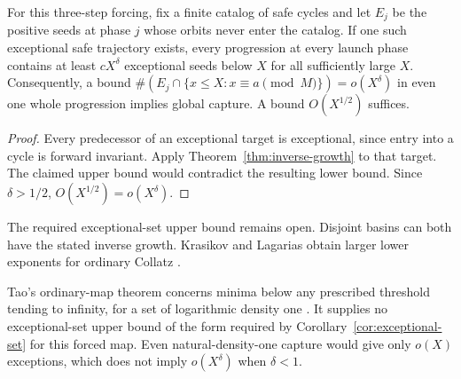 \begin{corollary}
\label{cor:exceptional-set}
For this three-step forcing, fix a finite catalog of safe cycles and let
$E_j$ be the positive seeds at phase $j$ whose orbits never enter the
catalog. If one such exceptional safe trajectory exists, every progression
at every launch phase contains at least $cX^\delta$ exceptional seeds
below $X$ for all sufficiently large $X$. Consequently, a bound
$\#(E_j\cap\{x\le X:x\equiv a\pmod M\})=o(X^\delta)$ in even one
whole progression implies global capture. A bound $O(X^{1/2})$ suffices.
\end{corollary}
\begin{proof}
Every predecessor of an exceptional target is exceptional, since entry
into a cycle is forward invariant. Apply Theorem~\ref{thm:inverse-growth}
to that target. The claimed upper bound would contradict the resulting
lower bound. Since $\delta>1/2$, $O(X^{1/2})=o(X^\delta)$.
\end{proof}

The required exceptional-set upper bound remains open. Disjoint basins
can both have the stated inverse growth. Krasikov and Lagarias obtain
larger lower exponents for ordinary Collatz \cite{krasikov-lagarias}.

Tao's ordinary-map theorem concerns minima below any prescribed threshold
tending to infinity, for a set of logarithmic density one
\cite[Theorem~1.3 and Remark~1.4]{tao}. It supplies no exceptional-set upper
bound of the form required by Corollary~\ref{cor:exceptional-set} for this
forced map. Even natural-density-one capture would give only $o(X)$
exceptions, which does not imply $o(X^\delta)$ when $\delta<1$.
